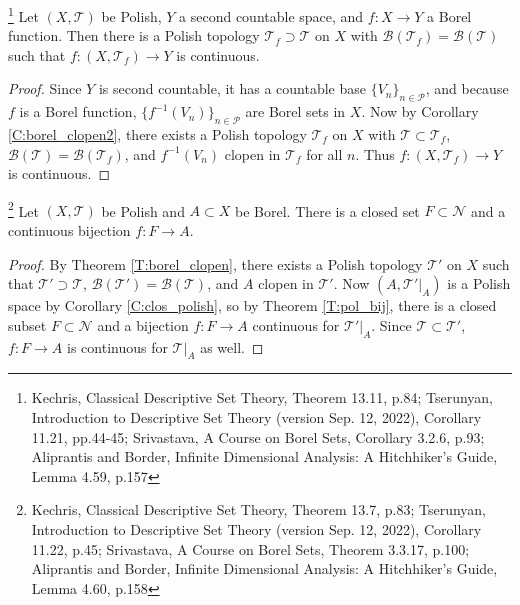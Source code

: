 \begin{theorem} \label{T:borel_cont}
\footnote{
  Kechris, Classical Descriptive Set Theory, Theorem 13.11, p.84;
  Tserunyan, Introduction to Descriptive Set Theory (version Sep. 12,
  2022), Corollary 11.21, pp.44-45; 
  Srivastava, A Course on Borel Sets, Corollary 3.2.6, p.93; 
  Aliprantis and Border, Infinite Dimensional Analysis: A Hitchhiker's 
  Guide, Lemma 4.59, p.157}
Let $(X,\mathcal{T})$ be Polish, $Y$ a second countable space, and 
$f:X\to Y$ a Borel function. 
Then there is a Polish topology $\mathcal{T}_f\supset \mathcal{T}$ on 
$X$ with $\mathcal{B}(\mathcal{T}_f)=\mathcal{B}(\mathcal{T})$ such that
$f:(X,\mathcal{T}_f)\to Y$ is continuous.
\end{theorem}
\begin{proof}
Since $Y$ is second countable, it has a countable base 
$\{V_n\}_{n\in\mathcal{P}}$, and because $f$ is a Borel function, 
$\{f^{-1}(V_n)\}_{n\in\mathcal{P}}$ are Borel sets in $X$. 
Now by Corollary \ref{C:borel_clopen2}, there exists a Polish topology 
$\mathcal{T}_f$ on $X$ with $\mathcal{T}\subset\mathcal{T}_f$, 
$\mathcal{B}(\mathcal{T})=\mathcal{B}(\mathcal{T}_f)$, and $f^{-1}(V_n)$ 
clopen in $\mathcal{T}_f$ for all $n$.
Thus $f:(X,\mathcal{T}_f)\to Y$ is continuous.
\end{proof}

\begin{corollary} \label{C:borel_rep}
\footnote{
  Kechris, Classical Descriptive Set Theory, Theorem 13.7, p.83;
  Tserunyan, Introduction to Descriptive Set Theory (version Sep. 12,
  2022), Corollary 11.22, p.45; 
  Srivastava, A Course on Borel Sets, Theorem 3.3.17, p.100; 
  Aliprantis and Border, Infinite Dimensional Analysis: A Hitchhiker's 
  Guide, Lemma 4.60, p.158}
Let $(X,\mathcal{T})$ be Polish and $A\subset X$ be Borel. There is a closed
set $F\subset\mathcal{N}$ and a continuous bijection $f:F\to A$. 
\end{corollary}
\begin{proof}
By Theorem \ref{T:borel_clopen}, there exists a Polish topology
$\mathcal{T}'$ on $X$ such that $\mathcal{T}'\supset\mathcal{T}$,
$\mathcal{B}(\mathcal{T}')=\mathcal{B}(\mathcal{T})$, and $A$ clopen
in $\mathcal{T}'$. Now $(A,\mathcal{T}'|_A)$ is a Polish space by 
Corollary \ref{C:clos_polish}, so by Theorem \ref{T:pol_bij}, 
there is a closed subset $F\subset\mathcal{N}$ and a bijection 
$f:F\to A$ continuous for $\mathcal{T}'|_A$. Since 
$\mathcal{T}\subset \mathcal{T}'$, $f:F\to A$ is continuous for 
$\mathcal{T}|_A$ as well.
\end{proof}


